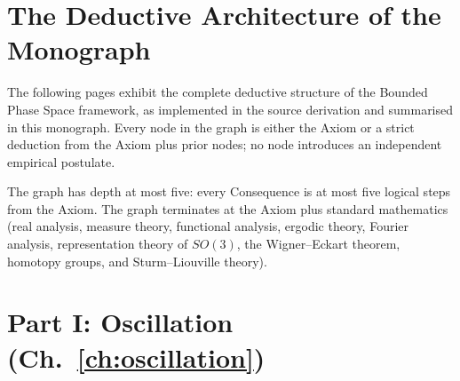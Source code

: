 
\section*{The Deductive Architecture of the Monograph}

The following pages exhibit the complete deductive structure of the Bounded
Phase Space framework, as implemented in the source derivation and
summarised in this monograph.  Every node in the graph is either the Axiom
or a strict deduction from the Axiom plus prior nodes; no node introduces
an independent empirical postulate.

The graph has depth at most five: every Consequence is at most five logical
steps from the Axiom.  The graph terminates at the Axiom plus standard
mathematics (real analysis, measure theory, functional analysis, ergodic
theory, Fourier analysis, representation theory of $SO(3)$, the
Wigner--Eckart theorem, homotopy groups, and Sturm--Liouville theory).

\section*{Part I: Oscillation (Ch.~\ref{ch:oscillation})}

